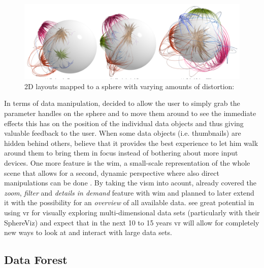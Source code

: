 \begin{figure}[h]
	\begin{center}
		\includegraphics[width=14cm]{03_Figures/05_LitReview/Kwon2015_SphericalGraphLayout.png}
		\caption[2D layouts mapped to a sphere with varying amounts of distortion]{2D layouts mapped to a sphere with varying amounts of distortion:  \citep{Kwon2015}}
		\label{fig:sphericalgraph}
	\end{center}
\end{figure} \newline
In terms of data manipulation, \cite{Soldati2007} decided to allow the user to simply grab the parameter handles on the sphere and to move them around to see the immediate effects this has on the position of the individual data objects and thus giving valuable feedback to the user. When some data objects (i.e. thumbnails) are hidden behind others, \cite{Soldati2007} believe that it provides the best experience to let him walk around them to bring them in focus instead of bothering about more input devices. One more feature is the \gls{wim}, a small-scale representation of the whole scene that allows for a second, dynamic perspective where also direct manipulations can be done \citep{Soldati2007}. By taking the \gls{vism} into acount, \cite{Soldati2007} already covered the \textit{zoom}, \textit{filter} and \textit{details in demand} feature with \gls{wim} and planned to later extend it with the possibility for an \textit{overview} of all available data. \cite{Soldati2007} see great potential in using \gls{vr} for visually exploring multi-dimensional data sets (particularly with their SphereViz) and expect that in the next 10 to 15 years \gls{vr} will allow for completely new ways to look at and interact with large data sets.



\subsection{Data Forest}


